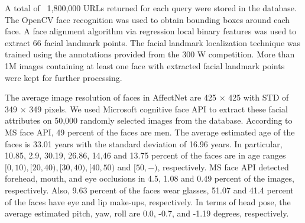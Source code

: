 A total of ~1,800,000 URLs returned for each query were stored in the database. The OpenCV face
recognition was used to obtain bounding boxes around each face. A face alignment algorithm via
regression local binary features was used to extract 66 facial landmark points. The facial landmark
localization technique was trained using the annotations provided from the 300 W competition. More
than 1M images containing at least one face with extracted facial landmark points were kept for
further processing.

The average image resolution of faces in AffectNet are 425 \(\times\) 425 with STD of 349 \(\times\)
349 pixels. We used Microsoft cognitive face API to extract these facial attributes on 50,000
randomly selected images from the database. According to MS face API, 49 percent of the faces are
men. The average estimated age of the faces is 33.01 years with the standard deviation of 16.96
years. In particular, 10.85, 2.9, 30.19, 26.86, 14,46 and 13.75 percent of the faces are in age
ranges $[0, 10), [20, 40), [30, 40), [40, 50)$ and $[50, -)$, respectively. MS face API detected
forehead, mouth, and eye occlusions in 4.5, 1.08 and 0.49 percent of the images, respectively. Also,
9.63 percent of the faces wear glasses, 51.07 and 41.4 percent of the faces have eye and lip
make-ups, respectively. In terms of head pose, the average estimated pitch, yaw, roll are 0.0, -0.7,
and -1.19 degrees, respectively.

\newpage

